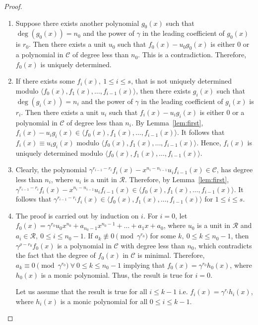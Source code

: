 \documentclass[10pt,a4paper]{amsart}
\begin{document}
\begin{proof}
    \begin{enumerate}
        \item Suppose there exists another polynomial $g_0(x)$ such that $\deg(g_0(x))=n_0$ and the power of $\gamma$ in the leading coefficient of $g_0(x)$ is $r_0$. Then there exists a unit $u_0$ such that $f_0(x)-u_0g_0(x)$ is either $0$ or a polynomial in $\mathcal{C}$ of degree less than $n_0$. This is a contradiction. Therefore, $f_0(x)$ is uniquely determined.
        \item If there exists some $f_i(x),~1 \le i \le s$, that is not uniquely determined modulo $\langle f_0(x),f_1(x), \dots , f_{i-1}(x) \rangle$, then there exists $g_i(x)$ such that $\deg(g_i(x))=n_i$ and the power of $\gamma$ in the leading coefficient of $g_i(x)$ is $r_i$. Then there exists a unit $u_i$ such that $f_i(x)-u_ig_i(x)$ is either $0$ or a polynomial in $\mathcal{C}$ of degree less than $n_i$. By Lemma~\ref{lem:first}, $f_i(x)-u_ig_i(x) \in \langle f_0(x),f_1(x), \dots, f_{i-1}(x) \rangle$. It follows that $f_i(x)\equiv u_ig_i(x)$ modulo $\langle f_0(x),f_1(x), \dots, f_{i-1}(x) \rangle$. Hence, $f_i(x)$ is uniquely determined modulo $\langle f_0(x),f_1(x), \dots, f_{i-1}(x) \rangle$.
        \item Clearly, the polynomial $\gamma^{r_{i-1}-r_i}f_i(x)-x^{n_i-n_{i-1}}u_if_{i-1}(x) \in \mathcal{C}$, has degree less than $n_i$, where $u_i$ is a unit in $\mathcal{R}$. Therefore, by Lemma~\ref{lem:first}, $\gamma^{r_{i-1}-r_i}f_i(x)-x^{n_i-n_{i-1}}u_if_{i-1}(x) \in \langle f_0(x),f_1(x), \dots, f_{i-1}(x) \rangle$. It follows that $\gamma^{r_{i-1}-r_i}f_i(x) \in \langle f_0(x), f_1(x), \dots, f_{i-1}(x) \rangle$ for $1 \le i \le s$.
        \item The proof is carried out by induction on $i$. For $i=0$, let $f_0(x)= \gamma^{r_0}u_0x^{n_0}+ a_{n_0-1}x^{n_0-1}+ \dots+a_1x+a_0$, where $u_0$ is a unit in $\mathcal{R}$ and $a_i \in \mathcal{R},~ 0 \le i \le n_0-1$. If $a_k \not\equiv 0 \pmod{\gamma^{r_0}}$ for some $k, ~0 \le k \le n_0-1$, then $\gamma^{\rho-r_0}f_0(x)$ is a polynomial in $\mathcal{C}$ with degree less than $n_0$, which contradicts the fact that the degree of $f_0(x)$ in $\mathcal{C}$ is minimal. Therefore, $a_k \equiv 0 \pmod{\gamma^{r_0}}~ \forall~ 0 \le k \le n_0-1$ implying that $f_0(x)=\gamma^{r_0}h_0(x)$, where $h_0(x)$ is a monic polynomial. Thus, the result is true for $i=0$.

        Let us assume that the result is true for all $i \le k-1$ i.e. $f_i(x)=\gamma^{r_i}h_i(x)$, where $h_i(x)$ is a monic polynomial for all $0 \le i \le k-1$.


\end{enumerate}
\end{proof}
\end{document}
